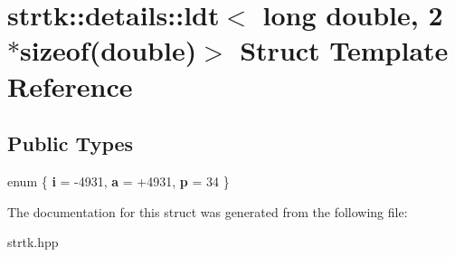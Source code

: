 \hypertarget{structstrtk_1_1details_1_1ldt_3_01long_01double_00_012_01_5sizeof_07double_08_4}{\section{strtk\-:\-:details\-:\-:ldt$<$ long double, 2 $\ast$sizeof(double)$>$ Struct Template Reference}
\label{structstrtk_1_1details_1_1ldt_3_01long_01double_00_012_01_5sizeof_07double_08_4}
}
\subsection*{Public Types}
\begin{DoxyCompactItemize}
\item 
enum \{ {\bfseries i} = -\/4931, 
{\bfseries a} = +4931, 
{\bfseries p} = 34
 \}
\end{DoxyCompactItemize}


The documentation for this struct was generated from the following file\-:\begin{DoxyCompactItemize}
\item 
strtk.\-hpp\end{DoxyCompactItemize}
